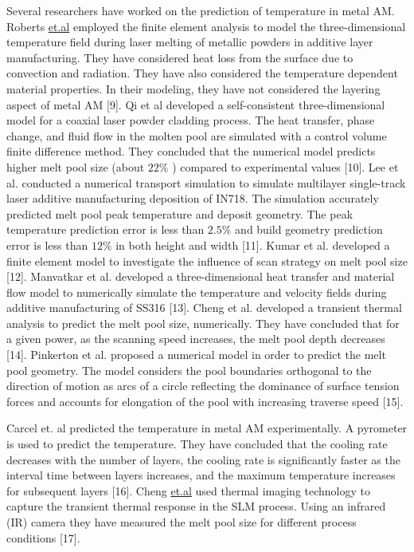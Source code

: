 \documentclass[10pt]{article}
\begin{document}
Several researchers have worked on the prediction of temperature in metal AM. Roberts \href{http://et.al}{et.al} employed the finite element analysis to model the three-dimensional temperature field during laser melting of metallic powders in additive layer manufacturing. They have considered heat loss from the surface due to convection and radiation. They have also considered the temperature dependent material properties. In their modeling, they have not considered the layering aspect of metal AM [9]. Qi et al developed a self-consistent three-dimensional model for a coaxial laser powder cladding process. The heat transfer, phase change, and fluid flow in the molten pool are simulated with a control volume finite difference method. They concluded that the numerical model predicts higher melt pool size (about $22 \%$ ) compared to experimental values [10]. Lee et al. conducted a numerical transport simulation to simulate multilayer single-track laser additive manufacturing deposition of IN718. The simulation accurately predicted melt pool peak temperature and deposit geometry. The peak temperature prediction error is less than $2.5 \%$ and build geometry prediction error is less than $12 \%$ in both height and width [11]. Kumar et al. developed a finite element model to investigate the influence of scan strategy on melt pool size [12]. Manvatkar et al. developed a three-dimensional heat transfer and material flow model to numerically simulate the temperature and velocity fields during additive manufacturing of SS316 [13]. Cheng et al. developed a transient thermal analysis to predict the melt pool size, numerically. They have concluded that for a given power, as the scanning speed increases, the melt pool depth decreases [14]. Pinkerton et al. proposed a numerical model in order to predict the melt pool geometry. The model considers the pool boundaries orthogonal to the direction of motion as arcs of a circle reflecting the dominance of surface tension forces and accounts for elongation of the pool with increasing traverse speed [15].

Carcel et. al predicted the temperature in metal AM experimentally. A pyrometer is used to predict the temperature. They have concluded that the cooling rate decreases with the number of layers, the cooling rate is significantly faster as the interval time between layers increases, and the maximum temperature increases for subsequent layers [16]. Cheng \href{http://et.al}{et.al} used thermal imaging technology to capture the transient thermal response in the SLM process. Using an infrared (IR) camera they have measured the melt pool size for different process conditions [17].
\end{document}
